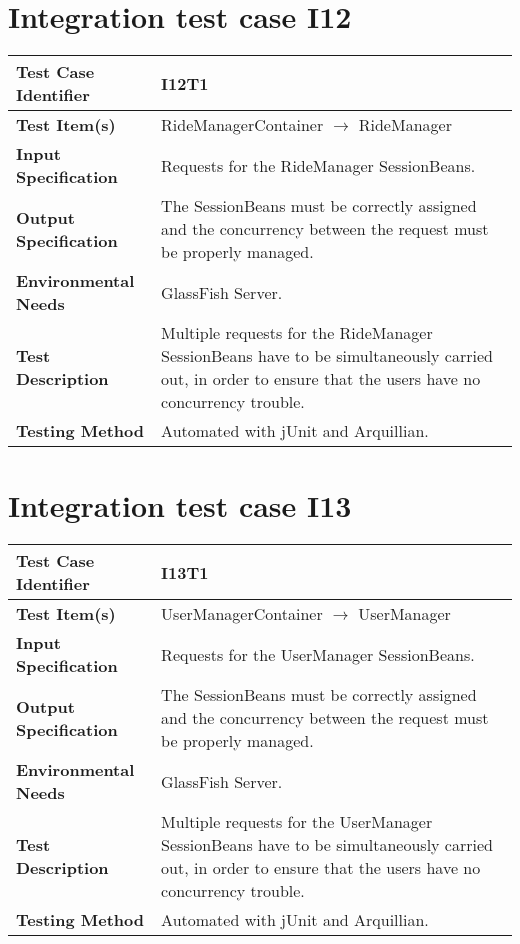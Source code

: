 \vspace{2em}

\section{Integration test case I12}

\begin{tabular}{l p{}}
    \hline
    \textbf{Test Case Identifier} & I12T1\\
    \hline
    \textbf{Test Item(s)} & RideManagerContainer $\rightarrow$ RideManager \\
    \hline
    \textbf{Input Specification} & Requests for the RideManager SessionBeans.\\
    \hline
    \textbf{Output Specification} & The SessionBeans must be correctly assigned and  the concurrency between the request must be properly managed.\\
    \hline
    \textbf{Environmental Needs} & GlassFish Server.\\
    \hline
    \textbf{Test Description} & Multiple requests for the RideManager SessionBeans have to be simultaneously carried out, in order to ensure that the users have no concurrency trouble.\\
    \hline
    \textbf{Testing Method} & Automated with jUnit and Arquillian.\\
    \hline
\end{tabular}

\vspace{2em}

\section{Integration test case I13}

\begin{tabular}{l p{}}
    \hline
    \textbf{Test Case Identifier} & I13T1\\
    \hline
    \textbf{Test Item(s)} & UserManagerContainer $\rightarrow$ UserManager \\
    \hline
    \textbf{Input Specification} & Requests for the UserManager SessionBeans.\\
    \hline
    \textbf{Output Specification} & The SessionBeans must be correctly assigned and  the concurrency between the request must be properly managed.\\
    \hline
    \textbf{Environmental Needs} & GlassFish Server.\\
    \hline
    \textbf{Test Description} & Multiple requests for the UserManager SessionBeans have to be simultaneously carried out, in order to ensure that the users have no concurrency trouble.\\
    \hline
    \textbf{Testing Method} & Automated with jUnit and Arquillian.\\
    \hline
\end{tabular}

